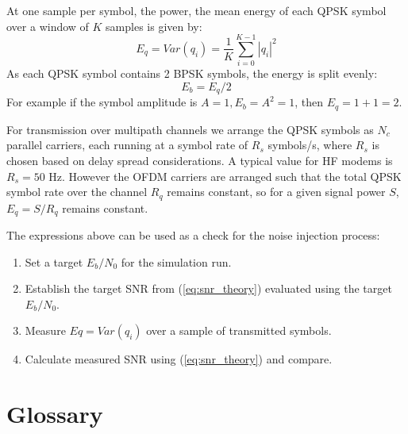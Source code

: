 \documentclass{article}
\begin{document}
At one sample per symbol, the power, the mean energy of each QPSK symbol over a window of $K$ samples is given by:
\begin{equation}
E_q = Var(q_i) = \frac{1}{K}\sum_{i=0}^{K-1}|q_i|^2
\end{equation}
As each QPSK symbol contains 2 BPSK symbols, the energy is split evenly:
\begin{equation}
E_b = E_q/2
\end{equation}
For example if the symbol amplitude is $A=1, E_b=A^2=1$, then $E_q=1+1=2$.

For transmission over multipath channels we arrange the QPSK symbols as $N_c$ parallel carriers, each running at a symbol rate of $R_s$ symbols/s, where $R_s$ is chosen based on delay spread considerations.  A typical value for HF modems is $R_s=50$ Hz. However the OFDM carriers are arranged such that the total QPSK symbol rate over the channel $R_q$ remains constant, so for a given signal power $S$, $E_q=S/R_q$ remains constant.

The expressions above can be used as a check for the noise injection process:
\begin{enumerate}
\item Set a target $E_b/N_0$ for the simulation run.
\item Establish the target SNR from (\ref{eq:snr_theory}) evaluated using the target $E_b/N_0$.
\item Measure $Eq=Var(q_i)$ over a sample of transmitted symbols.
\item Calculate measured SNR using (\ref{eq:snr_theory}) and compare. 
\end{enumerate}

\section{Glossary}
\end{document}
